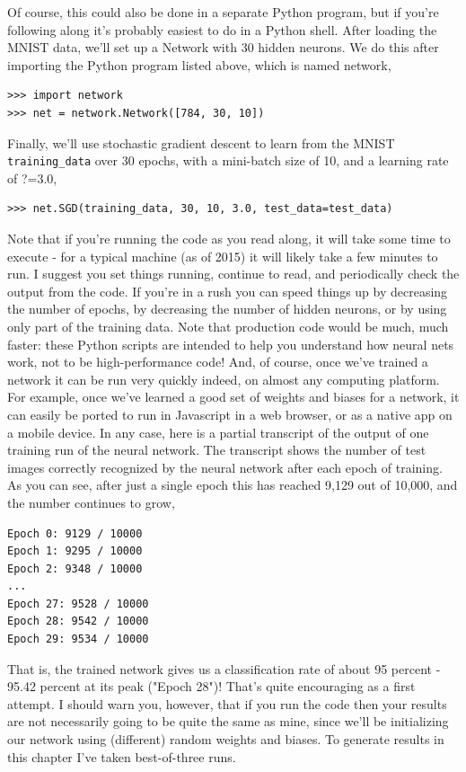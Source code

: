 Of course, this could also be done in a separate Python program, but if you're following along it's probably easiest to do in a Python shell. 
After loading the MNIST data, we'll set up a Network with 30 hidden neurons. We do this after importing the Python program listed above, which is named network,
\begin{lstlisting}
>>> import network
>>> net = network.Network([784, 30, 10])
\end{lstlisting}
Finally, we'll use stochastic gradient descent to learn from the MNIST \lstinline{training_data} over 30 epochs, with a mini-batch size of 10, and a learning rate of ?=3.0, 
\begin{lstlisting}
>>> net.SGD(training_data, 30, 10, 3.0, test_data=test_data)
\end{lstlisting}
Note that if you're running the code as you read along, it will take some time to execute - for a typical machine (as of 2015) it will likely take a few minutes to run. I suggest you set things running, continue to read, and periodically check the output from the code. If you're in a rush you can speed things up by decreasing the number of epochs, by decreasing the number of hidden neurons, or by using only part of the training data. Note that production code would be much, much faster: these Python scripts are intended to help you understand how neural nets work, not to be high-performance code! And, of course, once we've trained a network it can be run very quickly indeed, on almost any computing platform. For example, once we've learned a good set of weights and biases for a network, it can easily be ported to run in Javascript in a web browser, or as a native app on a mobile device. In any case, here is a partial transcript of the output of one training run of the neural network. The transcript shows the number of test images correctly recognized by the neural network after each epoch of training. As you can see, after just a single epoch this has reached 9,129 out of 10,000, and the number continues to grow,
\begin{lstlisting}
Epoch 0: 9129 / 10000
Epoch 1: 9295 / 10000
Epoch 2: 9348 / 10000
...
Epoch 27: 9528 / 10000
Epoch 28: 9542 / 10000
Epoch 29: 9534 / 10000
\end{lstlisting}
That is, the trained network gives us a classification rate of about 95 percent - 95.42 percent at its peak ("Epoch 28")! That's quite encouraging as a first attempt. I should warn you, however, that if you run the code then your results are not necessarily going to be quite the same as mine, since we'll be initializing our network using (different) random weights and biases. To generate results in this chapter I've taken best-of-three runs.
